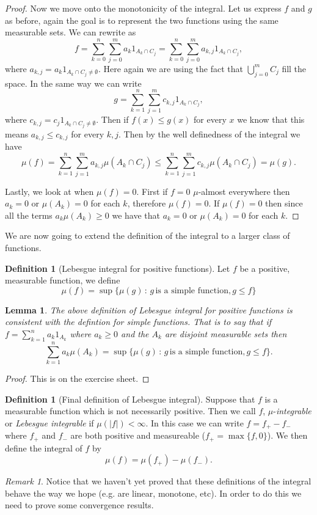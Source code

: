 \documentclass[11pt]{article}
\newtheorem{lem}[thm]{Lemma}
\theoremstyle{definition}
\newtheorem{dfn}[thm]{Definition}
\theoremstyle{remark}
\newtheorem{remark}[thm]{Remark}
\begin{document}
\begin{proof}
Now we move onto the monotonicity of the integral. Let us express $f$ and $g$ as before, again the goal is to represent the two functions using the same measurable sets. We can rewrite as
\[ f = \sum_{k=0}^n \sum_{j=0}^m a_k 1_{A_k \cap C_j} = \sum_{k=0}^n \sum_{j=0}^m a_{k,j}1_{A_k \cap C_j},\] where $a_{k,j} = a_k 1_{A_k \cap C_j \neq \emptyset}$. Here again we are using the fact that $\bigcup_{j=0}^m C_j$ fill the space. In the same way we can write
\[ g = \sum_{k=1}^n \sum_{j=1}^m c_{k,j}1_{A_k \cap C_j}, \] where $c_{k,j} = c_j 1_{A_k \cap C_j \neq \emptyset}$. Then if $f(x) \leq g(x)$ for every $x$ we know that this means $a_{k,j} \leq c_{k,j}$ for every $k,j$. Then by the well definedness of the integral we have
\[ \mu(f) = \sum_{k=1}^n \sum_{j=1}^m a_{k,j} \mu(A_k \cap C_j) \leq \sum_{k=1}^n \sum_{j=1}^m c_{k,j} \mu(A_k \cap C_j) = \mu(g).\]

Lastly, we look at when $\mu(f)=0$. First if $f=0$ $\mu$-almost everywhere then $a_k=0$ or $\mu(A_k)=0$ for each $k$, therefore $\mu(f)=0$. If $\mu(f) =0$ then since all the terms $a_k \mu(A_k) \geq 0$ we have that $a_k=0$ or $\mu(A_k) =0$ for each $k$.
\end{proof}

We are now going to extend the definition of the integral to a larger class of functions.
\begin{dfn}[Lebesgue integral for positive functions]
Let $f$ be a positive, measurable function, we define
\[ \mu(f) = \sup \{ \mu(g)\, :\, g \, \mbox{is a simple function}, g \leq f\} \]
\end{dfn}

\begin{lem}
The above definition of Lebesgue integral for positive functions is consistent with the defintion for simple functions. That is to say that if $f = \sum_{k=1}^n a_k 1_{A_k}$ where $a_k \geq 0$ and the $A_k$ are disjoint measurable sets then 
\[ \sum_{k=1}^n a_k \mu(A_k) = \sup \{ \mu(g)\, :\, g \, \mbox{is a simple function}, g \leq f\}.  \] 
\end{lem}
\begin{proof}
This is on the exercise sheet.
\end{proof}

\begin{dfn}[Final definition of Lebesgue integral]
Suppose that $f$ is a measurable function which is not necessarily positive. Then we call $f$, $\mu$-\emph{integrable} or \emph{Lebesgue integrable} if $\mu(|f|)< \infty$. In this case we can write $f = f_+ - f_{-}$ where $f_+$ and $f_-$ are both positive and measureable ($f_+ = \max\{f,  0\}$). We then define the integral of $f$ by
\[ \mu(f) = \mu(f_+) - \mu(f_-). \]
\end{dfn}
\begin{remark}
Notice that we haven't yet proved that these definitions of the integral behave the way we hope (e.g. are linear, monotone, etc). In order to do this we need to prove some convergence results.
\end{remark}
\end{document}
